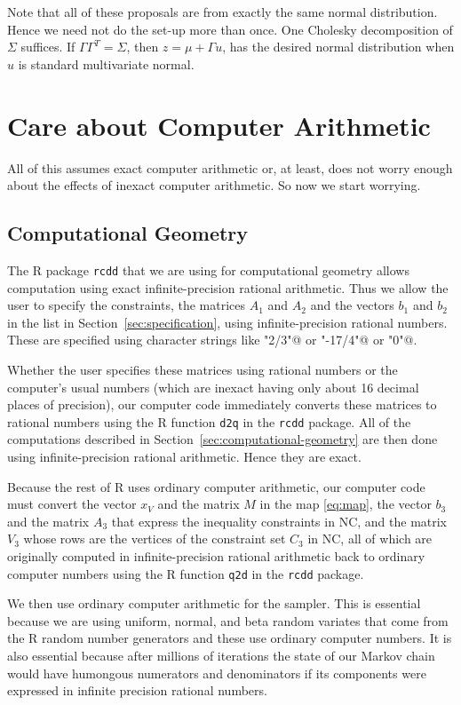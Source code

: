 \documentclass[11pt]{article}
\begin{document}
Note that all of these proposals are from exactly the same normal distribution.
Hence we need not do the set-up more than once.  One Cholesky decomposition
of $\Sigma$ suffices.  If $\Gamma \Gamma^T = \Sigma$,
then $z = \mu + \Gamma u$, has the desired normal distribution when $u$
is standard multivariate normal.

\section{Care about Computer Arithmetic}

All of this assumes exact computer arithmetic or, at least, does not
worry enough about the effects of inexact computer arithmetic.
So now we start worrying.

\subsection{Computational Geometry}

The R package \texttt{rcdd} that we are using for computational geometry
allows computation using exact infinite-precision rational arithmetic.
Thus we allow the user to specify the constraints, the matrices $A_1$ and
$A_2$ and the vectors $b_1$ and $b_2$ in the list
in Section~\ref{sec:specification}, using infinite-precision rational numbers.
These are specified using character strings like \verb@"2/3"@
or \verb@"-17/4"@ or \verb@"0"@.

Whether the user specifies these matrices using rational numbers or
the computer's usual numbers (which are inexact having only about 16
decimal places of precision), our computer code immediately converts
these matrices to rational numbers using the R function \texttt{d2q}
in the \texttt{rcdd} package.
All of the computations described in Section~\ref{sec:computational-geometry}
are then done using infinite-precision rational arithmetic.  Hence they
are exact.

Because the rest of R uses ordinary computer arithmetic, our computer code
must convert the vector $x_V$ and the matrix $M$ in the map \eqref{eq:map},
the vector $b_3$ and the matrix $A_3$ that express the inequality constraints
in NC, and the matrix $V_3$ whose rows are the vertices of the constraint
set $C_3$ in NC, all of which are originally computed in infinite-precision
rational arithmetic back to ordinary computer numbers using the R function
\texttt{q2d} in the \texttt{rcdd} package.

We then use ordinary computer arithmetic for the sampler.  This is essential
because we are using uniform, normal, and beta random variates that come
from the R random number generators and these use ordinary computer numbers.
It is also essential because after millions of iterations the state of our
Markov chain would have humongous numerators and denominators if its
components were expressed in infinite precision rational numbers.
\end{document}
